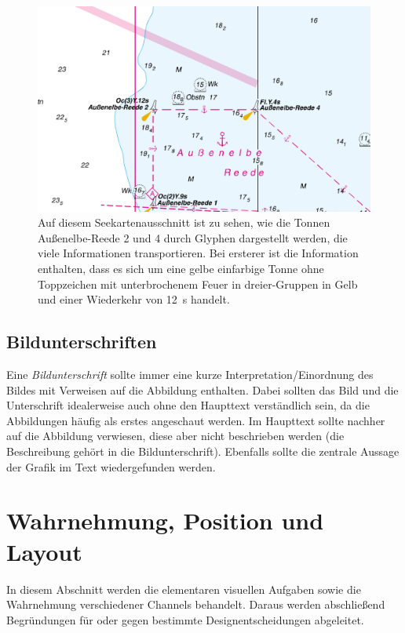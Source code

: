 				\begin{figure}
					\centering
					\includegraphics[width=0.8\linewidth]{glyphen}
					\caption[Beispiel eines Glyphs auf Basis einer Seekarte]{Auf diesem Seekartenausschnitt ist zu sehen, wie die Tonnen Außenelbe-Reede 2 und 4 durch Glyphen dargestellt werden, die viele Informationen transportieren. Bei ersterer ist \bspw die Information enthalten, dass es sich um eine gelbe einfarbige Tonne ohne Toppzeichen mit unterbrochenem Feuer in dreier-Gruppen in Gelb und einer Wiederkehr von \SI{12}{\second} handelt.}
					\label{fig:glyph}
				\end{figure}

		\subsection{Bildunterschriften}
			Eine \emph{Bildunterschrift} sollte immer eine kurze Interpretation/Einordnung des Bildes mit Verweisen auf die Abbildung enthalten. Dabei sollten das Bild und die Unterschrift idealerweise auch ohne den Haupttext verständlich sein, da die Abbildungen häufig als erstes angeschaut werden. Im Haupttext sollte nachher auf die Abbildung verwiesen, diese aber nicht beschrieben werden (die Beschreibung gehört in die Bildunterschrift). Ebenfalls sollte die zentrale Aussage der Grafik im Text wiedergefunden werden.

	\section{Wahrnehmung, Position und Layout}
		\label{sec:wahrnehmung}

		In diesem Abschnitt werden die elementaren visuellen Aufgaben sowie die Wahrnehmung verschiedener Channels behandelt. Daraus werden abschließend Begründungen für oder gegen bestimmte Designentscheidungen abgeleitet.

